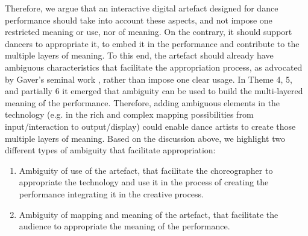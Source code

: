 Therefore, we argue that an interactive digital artefact designed for dance performance should take into account these aspects, and not impose one restricted meaning or use, nor of meaning. On the contrary, it should support dancers to appropriate it, to embed it in the performance and contribute to the multiple layers of meaning. To this end, the artefact should already have ambiguous characteristics that facilitate the appropriation process, as advocated by Gaver's seminal work \cite{gaver_ambiguity_2003}, rather than impose one clear usage. In Theme 4, 5, and partially 6 it emerged that ambiguity can be used to build the multi-layered meaning of the performance. Therefore, adding ambiguous elements in the technology (e.g. in the rich and complex mapping possibilities from input/interaction to output/display) could enable dance artists to create those multiple layers of meaning. Based on the discussion above, we highlight two different types of ambiguity that facilitate appropriation:
\begin{enumerate}
    \item Ambiguity of use of the artefact, that facilitate the choreographer to appropriate the technology and use it in the process of creating the performance integrating it in the creative process.
    \item Ambiguity of mapping and meaning of the artefact, that facilitate the audience to appropriate the meaning of the performance.
\end{enumerate}
